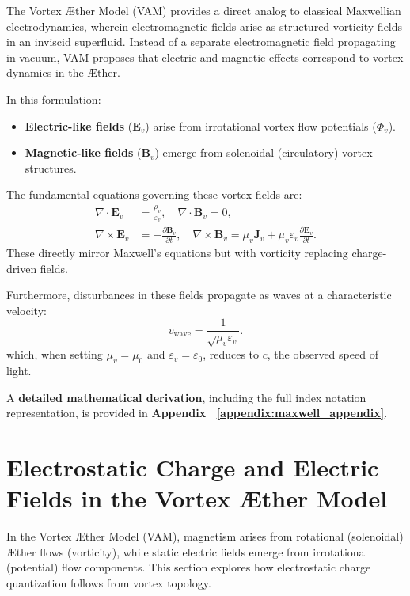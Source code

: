 \documentclass[a4paper,12pt]{article}
\begin{document}
The Vortex Æther Model (VAM) provides a direct analog to classical Maxwellian electrodynamics, wherein electromagnetic fields arise as structured vorticity fields in an inviscid superfluid. Instead of a separate electromagnetic field propagating in vacuum, VAM proposes that electric and magnetic effects correspond to vortex dynamics in the Æther.

In this formulation:
\begin{itemize}
    \item \textbf{Electric-like fields} (\(\mathbf{E}_v\)) arise from irrotational vortex flow potentials (\(\Phi_v\)).
    \item \textbf{Magnetic-like fields} (\(\mathbf{B}_v\)) emerge from solenoidal (circulatory) vortex structures.
\end{itemize}

The fundamental equations governing these vortex fields are:
\begin{align}
    \nabla \cdot \mathbf{E}_v &= \frac{\rho_v}{\varepsilon_v}, \quad \nabla \cdot \mathbf{B}_v = 0, \label{eq:gauss_vam} \\
    \nabla \times \mathbf{E}_v &= -\frac{\partial \mathbf{B}_v}{\partial t}, \quad \nabla \times \mathbf{B}_v = \mu_v \mathbf{J}_v + \mu_v \varepsilon_v \frac{\partial \mathbf{E}_v}{\partial t}. \label{eq:maxwell_vam}
\end{align}
These directly mirror Maxwell's equations but with vorticity replacing charge-driven fields.

Furthermore, disturbances in these fields propagate as waves at a characteristic velocity:
\begin{equation}
    v_\text{wave} = \frac{1}{\sqrt{\mu_v \varepsilon_v}}.
\end{equation}
which, when setting \(\mu_v = \mu_0\) and \(\varepsilon_v = \varepsilon_0\), reduces to \( c \), the observed speed of light.

A \textbf{detailed mathematical derivation}, including the full index notation representation, is provided in \textbf{Appendix~
\ref{appendix:maxwell_appendix}}.



\section{Electrostatic Charge and Electric Fields in the Vortex Æther Model}


In the Vortex Æther Model (VAM), magnetism arises from rotational (solenoidal) Æther flows (vorticity), while static electric fields emerge from irrotational (potential) flow components. This section explores how electrostatic charge quantization follows from vortex topology.
\end{document}
